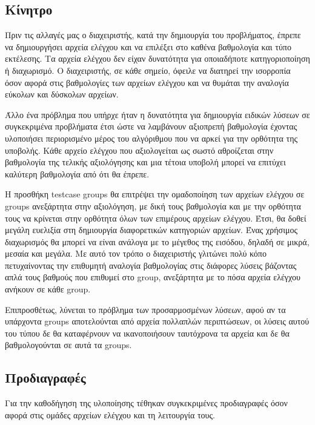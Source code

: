 \documentclass[diploma]{softlab-thesis}
\begin{document}
\subsection{Κίνητρο}

Πριν τις αλλαγές μας ο διαχειριστής, κατά την δημιουργία του προβλήματος,
έπρεπε να δημιουργήσει αρχεία ελέγχου και να επιλέξει στο καθένα βαθμολογία και
τύπο εκτέλεσης. Τα αρχεία ελέγχου δεν είχαν δυνατότητα για οποιαδήποτε
κατηγοριοποίηση ή διαχωρισμό. Ο διαχειριστής, σε κάθε σημείο, όφειλε να
διατηρεί την ισορροπία όσον αφορά στις βαθμολογίες των αρχείων ελέγχου και να
θυμάται την αναλογία εύκολων και δύσκολων αρχείων.

\bigskip

Άλλο ένα πρόβλημα που υπήρχε ήταν η δυνατότητα για δημιουργία ειδικών λύσεων σε
συγκεκριμένα προβλήματα έτσι ώστε να λαμβάνουν αξιοπρεπή βαθμολογία έχοντας
υλοποιήσει περιορισμένο μέρος του αλγόριθμου που να αρκεί για την ορθότητα της
υποβολής. Κάθε αρχείο ελέγχου που αξιολογείται ως σωστό αθροίζεται στην
βαθμολογία της τελικής αξιολόγησης και μια τέτοια υποβολή μπορεί να επιτύχει
καλύτερη βαθμολογία από ότι θα έπρεπε.

\bigskip

Η προσθήκη testcase groups θα επιτρέψει την ομαδοποίηση των αρχείων ελέγχου σε
groups ανεξάρτητα στην αξιολόγηση, με δική τους βαθμολογία και με την ορθότητα
τους να κρίνεται στην ορθότητα όλων των επιμέρους αρχείων ελέγχου. Έτσι, θα
δοθεί μεγάλη ευελιξία στη δημιουργία διαφορετικών κατηγοριών αρχείων. Ένας
χρήσιμος διαχωρισμός θα μπορεί να είναι ανάλογα με το μέγεθος της εισόδου,
δηλαδή σε μικρά, μεσαία και μεγάλα. Με αυτό τον τρόπο ο διαχειριστής γλιτώνει
πολύ κόπο πετυχαίνοντας την επιθυμητή αναλογία βαθμολογίας στις διάφορες λύσεις
βάζοντας απλά τους βαθμούς που επιθυμεί στο group, ανεξάρτητα με το πόσα αρχεία
ελέγχου ανήκουν σε κάθε group.

\bigskip

Επιπροσθέτως, λύνεται το πρόβλημα των προσαρμοσμένων λύσεων, αφού αν τα
υπάρχοντα groups αποτελούνται από αρχεία πολλαπλών περιπτώσεων, οι λύσεις αυτού
του τύπου δε θα καταφέρνουν να ικανοποιήσουν ταυτόχρονα τα αρχεία και δε θα
βαθμολογούνται σε αυτά τα groups.

\subsection{Προδιαγραφές}

Για την καθοδήγηση της υλοποίησης τέθηκαν συγκεκριμένες προδιαγραφές όσον
αφορά στις ομάδες αρχείων ελέγχου και τη λειτουργία τους.
\end{document}
